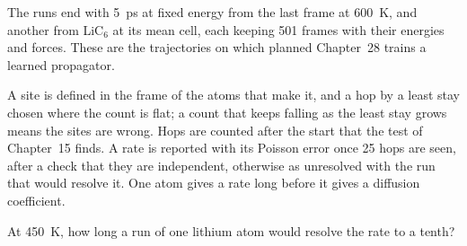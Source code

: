 The runs end with \SI{5}{\pico\second} at fixed energy from the last
frame at \SI{600}{\kelvin}, and another from LiC$_6$ at its mean cell,
each keeping 501 frames with their energies and forces. These are the
trajectories on which planned Chapter~28 trains a learned propagator.

\begin{keyidea}
A site is defined in the frame of the atoms that make it, and a hop by a
least stay chosen where the count is flat; a count that keeps falling as
the least stay grows means the sites are wrong. Hops are counted after
the start that the test of Chapter~15 finds. A rate is reported with its
Poisson error once 25 hops are seen, after a check that they are
independent, otherwise as unresolved with the run that would resolve it.
One atom gives a rate long before it gives a diffusion coefficient.
\end{keyidea}


\begin{selfcheck}
At \SI{450}{\kelvin}, how long a run of one lithium atom would resolve the
rate to a tenth?
\end{selfcheck}
